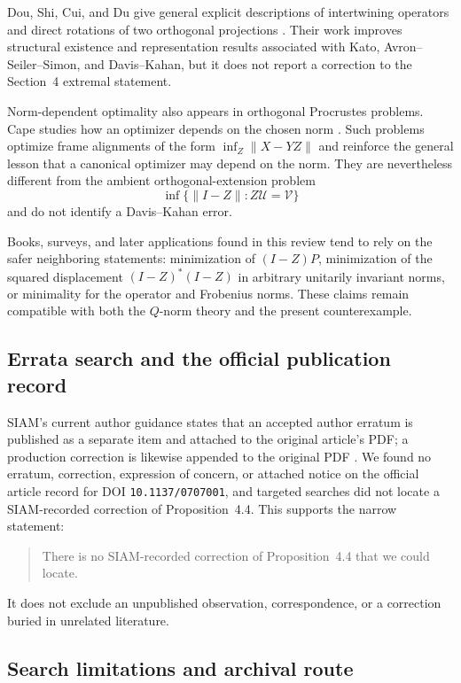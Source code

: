 \documentclass[11pt]{article}
\begin{document}
Dou, Shi, Cui, and Du give general explicit descriptions of intertwining
operators and direct rotations of two orthogonal projections
\cite{DouShiCuiDu2017}.  Their work improves structural existence and
representation results associated with Kato, Avron--Seiler--Simon, and
Davis--Kahan, but it does not report a correction to the Section~4 extremal
statement.

Norm-dependent optimality also appears in orthogonal Procrustes problems.  Cape
studies how an optimizer depends on the chosen norm
\cite{Cape2020}.  Such problems optimize frame alignments of the form
$\inf_Z\lVert X-YZ\rVert$ and reinforce the general lesson that a canonical
optimizer may depend on the norm.  They are nevertheless different from the
ambient orthogonal-extension problem
\[
 \inf\{\lVert I-Z\rVert:Z\mathcal U=\mathcal V\}
\]
and do not identify a Davis--Kahan error.

Books, surveys, and later applications found in this review tend to rely on the
safer neighboring statements: minimization of $(I-Z)P$, minimization of the
squared displacement $(I-Z)^*(I-Z)$ in arbitrary unitarily invariant norms, or
minimality for the operator and Frobenius norms.  These claims remain compatible
with both the $Q$-norm theory and the present counterexample.

\subsection{Errata search and the official publication record}

SIAM's current author guidance states that an accepted author erratum is
published as a separate item and attached to the original article's PDF; a
production correction is likewise appended to the original PDF
\cite{SIAMErrataPolicy}.  We found no erratum, correction, expression of
concern, or attached notice on the official article record for DOI
\texttt{10.1137/0707001}, and targeted searches did not locate a SIAM-recorded
correction of Proposition~4.4.  This supports the narrow statement:

\begin{quote}
There is no SIAM-recorded correction of Proposition~4.4 that we could locate.
\end{quote}

It does not exclude an unpublished observation, correspondence, or a correction
buried in unrelated literature.

\subsection{Search limitations and archival route}
\end{document}
